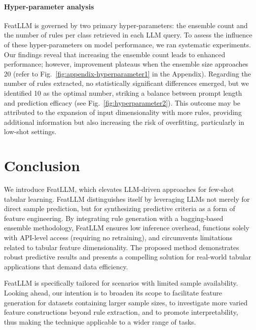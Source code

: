 \vspace*{-0.12in}
\paragraph{Hyper-parameter analysis}
\textsf{FeatLLM} is governed by two primary hyper-parameters: the ensemble count and the number of rules per class retrieved in each LLM query. To assess the influence of these hyper-parameters on model performance, we ran systematic experiments. Our findings reveal that increasing the ensemble count leads to enhanced performance; however, improvement plateaus when the ensemble size approaches 20 (refer to Fig.~\ref{fig:appendix-hyperparameter1} in the Appendix). Regarding the number of rules extracted, no statistically significant differences emerged, but we identified 10 as the optimal number, striking a balance between prompt length and prediction efficacy (see Fig.~\ref{fig:hyperparameter2}). This outcome may be attributed to the expansion of input dimensionality with more rules, providing additional information but also increasing the risk of overfitting, particularly in low-shot settings.

\section{Conclusion}
We introduce \textsf{FeatLLM}, which elevates LLM-driven approaches for few-shot tabular learning. \textsf{FeatLLM} distinguishes itself by leveraging LLMs not merely for direct sample prediction, but for synthesizing predictive criteria as a form of feature engineering. By integrating rule generation with a bagging-based ensemble methodology, \textsf{FeatLLM} ensures low inference overhead, functions solely with API-level access (requiring no retraining), and circumvents limitations related to tabular feature dimensionality. The proposed method demonstrates robust predictive results and presents a compelling solution for real-world tabular applications that demand data efficiency.

\textsf{FeatLLM} is specifically tailored for scenarios with limited sample availability. Looking ahead, our intention is to broaden its scope to facilitate feature generation for datasets containing larger sample sizes, to investigate more varied feature constructions beyond rule extraction, and to promote interpretability, thus making the technique applicable to a wider range of tasks.

